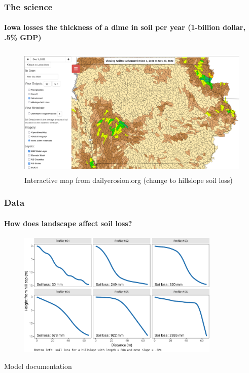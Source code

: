 \documentclass{snedecorbeamer}
\begin{document}
\begin{frame}
  \frametitle{The science}
  \framesubtitle{Iowa losses the thickness of a dime in soil per year (1-billion
    dollar, .5\% GDP)}

  \begin{figure}
    \centering
    \includegraphics[height=17em]{inc/dep_detachment_map_20220630_168.png}
      \caption{%
        \href{1}{}
        Interactive map from dailyerosion.org (change to hillslope soil loss)}
  \end{figure}
\end{frame}

\begin{frame}
  \frametitle{Data}
  \framesubtitle{How does landscape affect soil loss?}

  \begin{figure}
    \centering
    \includegraphics[height=16em]{inc/wepp_elevation_profiles}
  \end{figure}

  {\tiny
    Model documentation}
\end{frame}
\end{document}
